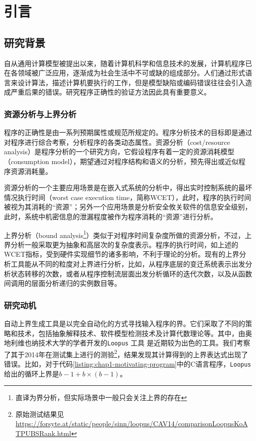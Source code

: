 
\chapter{引言}

\section{研究背景}

自从通用计算模型\cite{turing_computable_1937}被提出以来，随着计算机科学和信息技术的发展，计算机程序已在各领域被广泛应用，逐渐成为社会生活中不可或缺的组成部分。人们通过形式语言来设计算法，描述计算机要执行的工作，但是模型缺陷或编码错误往往会引入造成严重后果的错误。研究程序正确性的验证方法因此具有重要意义。

\subsection{资源分析与上界分析}
\label{section:chap1-bound-analysis-intro}
程序的正确性是由一系列预期属性或规范所规定的。程序分析技术的目标即是通过对程序进行综合考察，分析程序的各类动态属性。资源分析（cost/resource analysis）是程序分析的一个研究方向，它假设程序有着一定的资源消耗模型（consumption model），期望通过对程序结构和语义的分析，预先得出或近似程序资源消耗量。

资源分析的一个主要应用场景是在嵌入式系统的分析中，得出实时控制系统的最坏情况执行时间\cite{wilhelm_worst-case_2008}（worst case execution time，简称WCET），此时，程序的执行时间被视为其消耗的“资源”；另外一个应用场景是分析安全攸关软件的信息安全级别，此时，系统中机密信息的泄漏程度被作为程序消耗的“资源”进行分析\cite{smith_foundations_2009}。

上界分析（bound analysis\footnote{直译为界分析，但实际场景中一般只会关注上界的存在}）类似于对程序时间复杂度所做的资源分析，不过，上界分析一般采取更为抽象和高层次的复杂度表示。程序的执行时间，如上述的WCET指标，受到硬件实现细节的诸多影响，不利于理论的分析。现有的上界分析工具能从不同的粒度对上界进行分析，比如，从程序底层的变迁系统表示出发分析状态转移的次数，或者从程序控制流层面出发分析循环的迭代次数\cite{sinn_simple_2014}，以及从函数间调用的层面分析递归的实例数目\cite{gulwani_speed_2009, gulwani_control-flow_2009}等。

\subsection{研究动机}

自动上界生成工具是以完全自动化的方式寻找输入程序的界。它们采取了不同的策略和技术，包括抽象解释技术、软件模型检测技术及计算代数理论等。其中，由奥地利维也纳技术大学的学者开发的\texttt{Loopus} 工具 \cite{sinn_simple_2014,zuleger_bound_2011,sinn_difference_2015,sinn_complexity_2017}是近期较为出色的工具。我们考察了其于2014年在测试集上进行的测验\footnote{原始测试结果见\url{https://forsyte.at/static/people/sinn/loopus/CAV14/comparisonLoopusKoATPUBSRank.html}}，结果发现其计算得到的上界表达式出现了错误。比如，对于代码\ref{listing:chap1-motivating-program}中的C语言程序，\texttt{Loopus}给出的循环上界是$b - 1 + b \times (b - 1)$。

